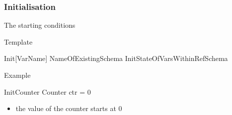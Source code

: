 \documentclass{article}
\begin{document}
\subsubsection{Initialisation}
The starting conditions
\begin{paragraph}{Template}
\begin{schema}{Init[VarName]}
  NameOfExistingSchema
  \where
  InitStateOfVarsWithinRefSchema
\end{schema}
\end{paragraph}
\begin{paragraph}{Example}
  \begin{schema}{InitCounter}
    Counter
    \where
    ctr = 0
  \end{schema}
  \begin{itemize}
    \item the value of the counter starts at 0
  \end{itemize}
\end{paragraph}
\end{document}
